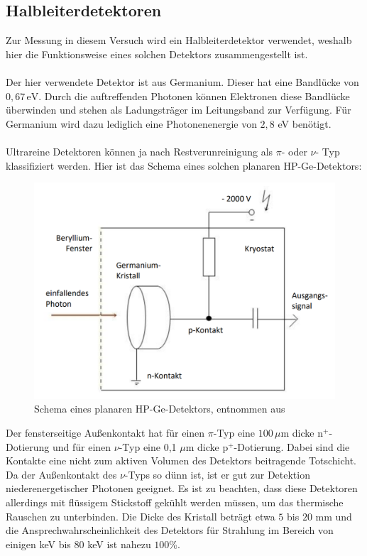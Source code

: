\documentclass[german,  %
parskip=full,  %
]{scrartcl}
\begin{document}
\subsection{Halbleiterdetektoren}
Zur Messung in diesem Versuch wird ein Halbleiterdetektor verwendet, weshalb hier die Funktionsweise eines solchen Detektors zusammengestellt ist.\\\\
Der hier verwendete Detektor ist aus Germanium. Dieser hat eine Bandlücke von $0,67 \, \text{eV}$. Durch die auftreffenden Photonen können Elektronen diese Bandlücke überwinden und stehen als Ladungsträger im Leitungsband zur Verfügung. Für Germanium wird dazu lediglich eine Photonenenergie von $2,8$ eV benötigt.
\\\\
Ultrareine Detektoren können ja nach Restverunreinigung als $\pi$- oder $\nu$- Typ klassifiziert werden. Hier ist das Schema eines solchen planaren HP-Ge-Detektors:
\begin{figure}[h!]\centering
\includegraphics[scale=0.4]{detektor}
\caption{Schema eines planaren HP-Ge-Detektors, entnommen aus \cite{Anleitung}}
\end{figure}
\newpage
Der fensterseitige Außenkontakt hat für einen $\pi$-Typ eine $100 \, \mu$m dicke $\text{n}^{+}$-Dotierung und für einen $\nu$-Typ eine 0,1 $\mu$m dicke $\text{p}^{+}$-Dotierung. Dabei sind die Kontakte eine nicht zum aktiven Volumen des Detektors beitragende Totschicht. Da der Außenkontakt des $\nu$-Typs so dünn ist, ist er gut zur Detektion niederenergetischer Photonen geeignet. Es ist zu beachten, dass diese Detektoren allerdings mit flüssigem Stickstoff gekühlt werden müssen, um das thermische Rauschen zu unterbinden. Die Dicke des Kristall beträgt etwa $5$ bis $20$ mm und die Ansprechwahrscheinlichkeit des Detektors für Strahlung im Bereich von einigen keV bis $80$ keV ist nahezu $100$\%.
\end{document}
